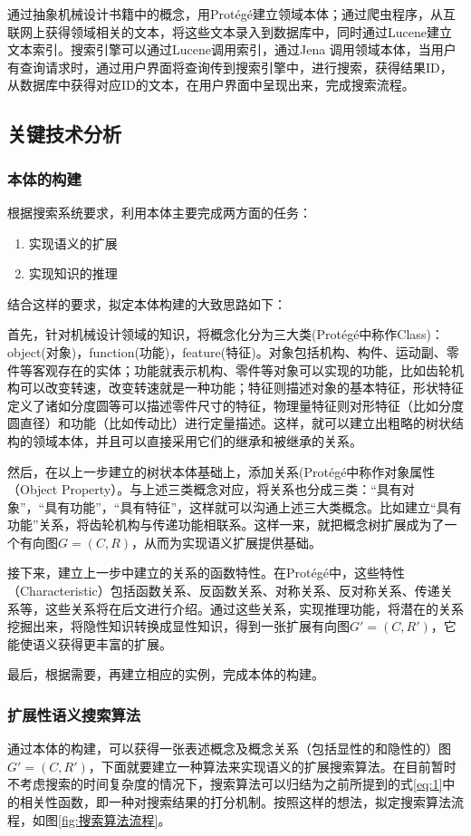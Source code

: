 \documentclass[12pt,a4paper]{article}
\begin{document}
	通过抽象机械设计书籍中的概念，用Prot{\'e}g{\'e}建立领域本体；通过爬虫程序，从互联网上获得领域相关的文本，将这些文本录入到数据库中，同时通过Lucene建立文本索引。搜索引擎可以通过Lucene调用索引，通过Jena 调用领域本体，当用户有查询请求时，通过用户界面将查询传到搜索引擎中，进行搜索，获得结果ID，从数据库中获得对应ID的文本，在用户界面中呈现出来，完成搜索流程。
				
	\subsection{关键技术分析}
		\subsubsection{本体的构建}
	根据搜索系统要求，利用本体主要完成两方面的任务：
	\begin{enumerate}
		\item
		实现语义的扩展
		\item
		实现知识的推理
	\end{enumerate}
	结合这样的要求，拟定本体构建的大致思路如下：
	
	首先，针对机械设计领域的知识，将概念化分为三大类(Prot{\'e}g{\'e}中称作Class)：object(对象)，function(功能)，feature(特征)。对象包括机构、构件、运动副、零件等客观存在的实体；功能就表示机构、零件等对象可以实现的功能，比如齿轮机构可以改变转速，改变转速就是一种功能；特征则描述对象的基本特征，形状特征定义了诸如分度圆等可以描述零件尺寸的特征，物理量特征则对形特征（比如分度圆直径）和功能（比如传动比）进行定量描述。这样，就可以建立出粗略的树状结构的领域本体，并且可以直接采用它们的继承和被继承的关系。
	
	然后，在以上一步建立的树状本体基础上，添加关系(Prot{\'e}g{\'e}中称作对象属性（Object Property）。与上述三类概念对应，将关系也分成三类：“具有对象”，“具有功能”，“具有特征”，这样就可以沟通上述三大类概念。比如建立“具有功能”关系，将齿轮机构与传递功能相联系。这样一来，就把概念树扩展成为了一个有向图$ G=(C, R) $，从而为实现语义扩展提供基础。
	
	接下来，建立上一步中建立的关系的函数特性。在Prot{\'e}g{\'e}中，这些特性（Characteristic）包括函数关系、反函数关系、对称关系、反对称关系、传递关系等，这些关系将在后文进行介绍。通过这些关系，实现推理功能，将潜在的关系挖掘出来，将隐性知识转换成显性知识，得到一张扩展有向图$ G'=(C, R')$，它能使语义获得更丰富的扩展。
	
	最后，根据需要，再建立相应的实例，完成本体的构建。
	
		\subsubsection{扩展性语义搜索算法}
	通过本体的构建，可以获得一张表述概念及概念关系（包括显性的和隐性的）图$ G'=(C, R') $，下面就要建立一种算法来实现语义的扩展搜索算法。在目前暂时不考虑搜索的时间复杂度的情况下，搜索算法可以归结为之前所提到的式\ref{eq:1}中的相关性函数，即一种对搜索结果的打分机制。按照这样的想法，拟定搜索算法流程，如图\ref{fig:搜索算法流程}。
	
\end{document}
